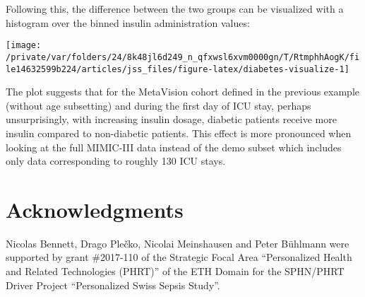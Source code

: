 \documentclass[
  notitle,
  nojss,
  noheadings]{jss}
\begin{document}
\begin{CodeChunk}
\begin{CodeInput}
R> grep_diab <- function(x) {
+   grepl("^250\\.?[0-9]{2}$", x)
+ }
R> 
R> diab  <- item(src, table = "diagnoses_icd",
+               callback = transform_fun(grep_diab),
+               class = "col_itm")
R> 
R> diab  <- concept("diab", diab, "diabetes", target = "id_tbl",
+                  class = "lgl_cncpt")
R> 
R> dat <- load_concepts(c(ins24, diab), id_type = "icustay",
+                      verbose = FALSE)
R> dat <- replace_na(dat, "[0,1)", vars = "ins24")
R> 
R> dat
\end{CodeInput}
\end{CodeChunk}

Following this, the difference between the two groups can be visualized
with a histogram over the binned insulin administration values:

\begin{CodeChunk}


\begin{center}\texttt{[image: /private/var/folders/24/8k48jl6d249\_n\_qfxwsl6xvm0000gn/T/RtmphhAogK/file14632599b224/articles/jss\_files/figure-latex/diabetes-visualize-1]} \end{center}

\end{CodeChunk}

The plot suggests that for the MetaVision cohort defined in the previous
example (without age subsetting) and during the first day of ICU stay,
perhaps unsurprisingly, with increasing insulin dosage, diabetic
patients receive more insulin compared to non-diabetic patients. This
effect is more pronounced when looking at the full MIMIC-III data
instead of the demo subset which includes only data corresponding to
roughly 130 ICU stays.

\hypertarget{acknowledgments}{%
\section{Acknowledgments}\label{acknowledgments}}

Nicolas Bennett, Drago Plečko, Nicolai Meinshausen and Peter Bühlmann
were supported by grant \#2017-110 of the Strategic Focal Area
``Personalized Health and Related Technologies (PHRT)'' of the ETH
Domain for the SPHN/PHRT Driver Project ``Personalized Swiss Sepsis
Study''.


\end{document}
